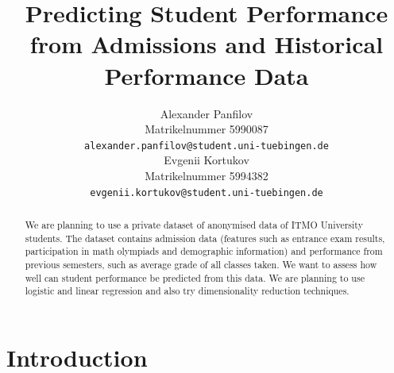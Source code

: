 \documentclass{article}
\title{Predicting Student Performance\\ from Admissions and Historical Performance Data}
\author{%
  Alexander Panfilov\\
  Matrikelnummer 5990087\\
  \texttt{alexander.panfilov@student.uni-tuebingen.de} \\
  \And
  Evgenii Kortukov\\
  Matrikelnummer 5994382\\
  \texttt{evgenii.kortukov@student.uni-tuebingen.de} \\
}
\begin{document}
\maketitle

\begin{abstract}
   We are planning to use a private dataset of anonymised data of ITMO University
   students. The dataset contains admission data (features such as entrance exam results,
   participation in math olympiads and demographic information) and performance from 
   previous semesters, such as average grade of all classes taken. We want to assess how well
   can student performance be predicted from this data. We are planning to use logistic and
   linear regression and also try dimensionality reduction techniques.
\end{abstract}

\section{Introduction}
\end{document}
